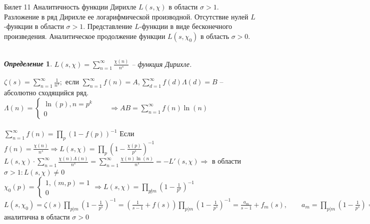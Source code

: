 \documentclass[a4paper,12pt]{article}
\newtheorem{deff}{\textit{Определение}}
\newcommand{\FI}{\varphi}
\newcommand{\q}{\quad}
\newcommand{\Ra}{\Rightarrow}
\newcommand{\SL}{\sum\limits}
\newcommand{\os}{\left(}
\newcommand{\cs}{\right)}
\begin{document}
\newpage
\begin{mybox}{\hypertarget{bil11}{Билет 11}}
Аналитичность функции Дирихле $L(s,\chi)$ в области $\sigma > 1$. Разложение в ряд Дирихле ее логарифмической производной. Отсутствие нулей $L$-функции в области $\sigma > 1$. Представление $L$-функции в виде бесконечного произведения. Аналитическое продолжение функции $L(s,\chi_0)$ в область $\sigma > 0$.\\\q\\
\begin{deff}
$L(s,\chi) = \SL_{n=1}^\infty \frac{\chi(n)}{n^s}$ -- функция Дирихле.
\end{deff}
$\zeta(s) = \SL_{n=1}^\infty \frac{1}{n^s};$ если $\SL_{n=1}^\infty f(n) = A, \SL_{d=1}^\infty f(d)\Lambda(d) = B$ -- абсолютно сходящийся ряд. $\Lambda(n) = \begin{cases} \ln(p), n=p^k\\0  \end{cases} \q\q \Ra AB = \SL_{n=1}^\infty f(n)\ln(n)$\\\q\\
$\SL_{n=1}^\infty f(n) = \prod\limits_p \os 1 - f(p)\cs^{-1}$ Если $f(n) = \frac{\chi(n)}{n^s}\Ra L(s,\chi) = \prod\limits_p \os 1 - \frac{\chi(p)}{p^s}   \cs^{-1} $\\
$L(s,\chi) \cdot \SL_{n=1}^\infty \frac{\chi(n)\Lambda(n)}{n^s} = \SL_{n=1}^\infty \frac{\chi(n)\ln(n)}{n^s}  = -L'(s,\chi)\Ra $ в области $\sigma > 1: L(s,\chi)\not=0$\\
$\chi_0(p) = \begin{cases} 1, (m,p) = 1\\0  \end{cases}\Ra L(s,\chi) = \prod\limits_{p\not|m}(1 - \frac{1}{p^s})^{-1} $\\
$L(s,\chi_0) = \zeta(s) \prod\limits_{p|m} (1 - \frac{1}{p^s})^{-1} = \os \frac{1}{s-1} + f(s) \cs  \prod\limits_{p|m} (1 - \frac{1}{p^s})^{-1} = \frac{a_m}{s-1} + f_m(s),\q\q a_m = \prod\limits_{p|m} (1 - \frac{1}{p^s}) = \frac{\FI(m)}{m} > 0 \Ra  L(s,\chi_0)$  аналитична в области $\sigma > 0$
\end{mybox}
\end{document}
